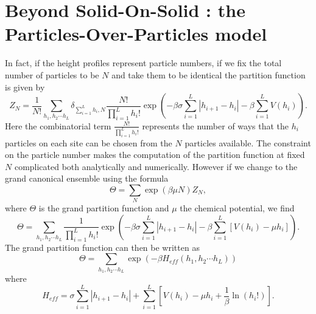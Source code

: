 \chapter{Beyond Solid-On-Solid : the Particles-Over-Particles model}

In fact, if the height profiles represent particle numbers, if we fix the total number of particles to be $N$ and take them to be identical the partition function is given by
\begin{equation}
    Z_N = \frac{1}{N!}\sum_{h_1,h_2\cdots h_L} \delta_{\sum_{i=1}^L h_i, N}\frac{N!}{\prod_{i=1}^L h_i!} \exp\left(-\beta \sigma \sum_{i=1}^L |h_{i+1}-h_i| -\beta\sum_{i=1}^L V(h_i)\right).
\end{equation}
Here the combinatorial term $\frac{N!}{\prod_{i=1}^L h_i!}$ represents the number of ways that the $h_i$ particles on each site can be chosen from the $N$ particles available. The constraint on the particle number makes the computation of the partition function at fixed $N$ complicated both analytically and numerically. However if we change to the grand canonical ensemble using
the formula
\begin{equation}
    \Theta = \sum_{N} \exp(\beta\mu N) Z_N,
\end{equation}
where $\Theta$ is the grand partition function and $\mu$ the chemical potential, we find
\begin{equation}
    \Theta = \sum_{h_1,h_2\cdots h_L} \frac{1}{\prod_{i=1}^L h_i!} \exp\left(-\beta \sigma \sum_{i=1}^L |h_{i+1}-h_i| -\beta\sum_{i=1}^L[ V(h_i)-\mu h_i]\right).
\end{equation}
The grand partition function can then be written as 
\begin{equation}
    \Theta = \sum_{h_1,h_2\cdots h_L} \exp\left(-\beta H_{eff}(h_1,h_2\cdots h_L)\right)
\end{equation}
where 
\begin{equation}
    H_{eff}= \sigma \sum_{i=1}^L |h_{i+1}-h_i| +\sum_{i=1}^L [V(h_i)-\mu h_i +\frac{1}{\beta}\ln(h_i !)].
\end{equation}

